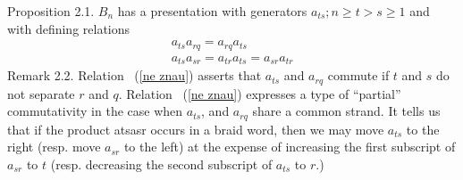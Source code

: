 \documentclass{article}
\begin{document}
Proposition 2.1. $B_n$ has a presentation with generators {$a_{ts};n \geqslant t >s \geqslant 1$} and with defining relations
\begin{eqnarray}
a_{ts}a_{rq}=a_{rq}a_{ts} \\ a_{ts}a_{sr}=a_{tr}a_{ts}=a_{sr}a_{tr}
\end{eqnarray}
Remark 2.2. Relation ~(\ref{ne znau}) asserts that $a_{ts}$ and $a_{rq}$ commute if $t$ and $s$ do
not separate $r$ and $q$. Relation ~(\ref{ne znau}) expresses a type of ``partial'' commutativity in the case when $a_{ts}$, and $a_{rq}$ share a common strand. It tells us that if the product atsasr occurs in a braid word, then we may move $a_{ts}$ to the right (resp. move $a_{sr}$ to the left) at the expense of increasing the first subscript of $a_{sr}$ to $t$ (resp. decreasing the second subscript of $a_{ts}$ to $r$.)
\end{document}
